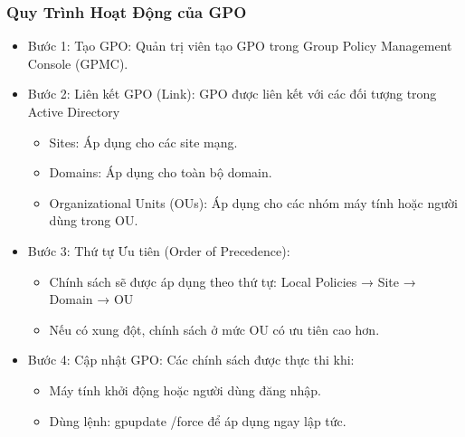\documentclass[13pt]{article}
\begin{document}
                \subsubsection{Quy Trình Hoạt Động của GPO}
                \begin{itemize}
                \item Bước 1: Tạo GPO: Quản trị viên tạo GPO trong Group Policy Management Console (GPMC).

                \item Bước 2: Liên kết GPO (Link): GPO được liên kết với các đối tượng trong Active Directory
                    \begin{itemize}
                        \item Sites: Áp dụng cho các site mạng.

                        \item Domains: Áp dụng cho toàn bộ domain.

                        \item Organizational Units (OUs): Áp dụng cho các nhóm máy tính hoặc người dùng trong OU.
                        
                    \end{itemize}

                \item Bước 3: Thứ tự Ưu tiên (Order of Precedence):
                    \begin{itemize}
                        \item Chính sách sẽ được áp dụng theo thứ tự: Local Policies → Site → Domain → OU

                        \item Nếu có xung đột, chính sách ở mức OU có ưu tiên cao hơn.
                        
                    \end{itemize}

                \item Bước 4: Cập nhật GPO: Các chính sách được thực thi khi:
                    \begin{itemize}
                        \item Máy tính khởi động hoặc người dùng đăng nhập.

                        \item Dùng lệnh: gpupdate /force để áp dụng ngay lập tức.
                        
                    \end{itemize}
                \end{itemize}
\end{document}
